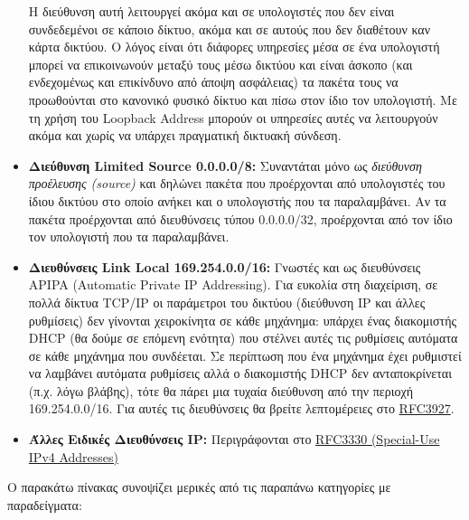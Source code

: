 \begin{itemize}
Η διεύθυνση αυτή λειτουργεί ακόμα και σε υπολογιστές που δεν είναι συνδεδεμένοι σε κάποιο δίκτυο, ακόμα και σε αυτούς που δεν διαθέτουν καν κάρτα δικτύου. Ο λόγος είναι ότι διάφορες υπηρεσίες μέσα σε ένα υπολογιστή μπορεί να επικοινωνούν μεταξύ τους μέσω δικτύου και είναι άσκοπο (και ενδεχομένως και επικίνδυνο από άποψη ασφάλειας) τα πακέτα τους να προωθούνται στο κανονικό φυσικό δίκτυο και πίσω στον ίδιο τον υπολογιστή. Με τη χρήση του Loopback Address μπορούν οι υπηρεσίες αυτές να λειτουργούν ακόμα και χωρίς να υπάρχει πραγματική δικτυακή σύνδεση.

\item \textbf{Διεύθυνση Limited Source 0.0.0.0/8:} Συναντάται μόνο ως \emph{διεύθυνση προέλευσης (source)} και δηλώνει πακέτα που προέρχονται από υπολογιστές του ίδιου δικτύου στο οποίο ανήκει και ο υπολογιστής που τα παραλαμβάνει. Αν τα πακέτα προέρχονται από διευθύνσεις τύπου 0.0.0.0/32, προέρχονται από τον ίδιο τον υπολογιστή που τα παραλαμβάνει.

\item \textbf{Διευθύνσεις Link Local 169.254.0.0/16:} Γνωστές και ως διευθύνσεις APIPA (Automatic Private IP Addressing). Για ευκολία στη διαχείριση, σε πολλά δίκτυα TCP/IP οι παράμετροι του δικτύου (διεύθυνση IP και άλλες ρυθμίσεις) δεν γίνονται χειροκίνητα σε κάθε μηχάνημα: υπάρχει ένας διακομιστής DHCP (θα δούμε σε επόμενη ενότητα) που στέλνει αυτές τις ρυθμίσεις αυτόματα σε κάθε μηχάνημα που συνδέεται. Σε περίπτωση που ένα μηχάνημα έχει ρυθμιστεί να λαμβάνει αυτόματα ρυθμίσεις αλλά ο διακομιστής DHCP δεν ανταποκρίνεται (π.χ. λόγω βλάβης), τότε θα πάρει μια τυχαία διεύθυνση από την περιοχή 169.254.0.0/16. Για αυτές τις διευθύνσεις θα βρείτε λεπτομέρειες στο \href{https://tools.ietf.org/html/rfc3927}{RFC3927}.
\item \textbf{Άλλες Ειδικές Διευθύνσεις IP:} Περιγράφονται στο \href{https://tools.ietf.org/html/rfc3330}{RFC3330 (Special-Use IPv4 Addresses)} 
\end{itemize}

Ο παρακάτω πίνακας συνοψίζει μερικές από τις παραπάνω κατηγορίες με παραδείγματα:

